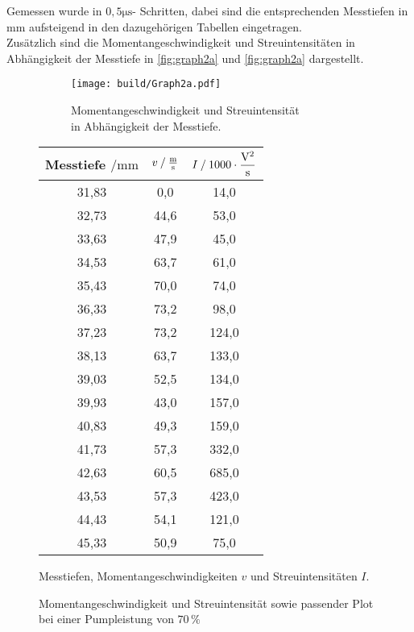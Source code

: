 Gemessen wurde in $0,5 \unit{\micro\second}$- Schritten, dabei sind die entsprechenden Messtiefen in $\unit{\milli\meter}$ aufsteigend in den dazugehörigen Tabellen eingetragen. \\

Zusätzlich sind die Momentangeschwindigkeit und Streuintensitäten in Abhängigkeit der Messtiefe in \autoref{fig:graph2a} und \autoref{fig:graph2a} dargestellt.

\begin{figure}[H]
    \begin{subfigure}{0.57\textwidth} 
        \centering
        \texttt{[image: build/Graph2a.pdf]} 
        \caption{Momentangeschwindigkeit und Streuintensität \\ in Abhängigkeit der Messtiefe.}
        \label{fig:graph2a}
        \qquad
    \end{subfigure}
    \begin{subtable}{0.43\textwidth}
        \centering
       \begin{tabular}{c c c}
        \toprule 
        {Messtiefe $\mathbin{/} \unit{\milli\meter}$} & {$v \mathbin{/} \unit{\frac{\meter}{\second}} $} & {$I \mathbin{/} 1000 \cdot \unit{\dfrac{\volt^2}{\second}}$}  \\
        \midrule 
           31,83     &      0,0     &     14,0    \\
           32,73     &     44,6     &     53,0    \\
           33,63     &     47,9     &     45,0    \\
           34,53     &     63,7     &     61,0    \\
           35,43     &     70,0     &     74,0    \\
           36,33     &     73,2     &     98,0    \\
           37,23     &     73,2     &    124,0    \\
           38,13     &     63,7     &    133,0    \\
           39,03     &     52,5     &    134,0    \\
           39,93     &     43,0     &    157,0    \\
           40,83     &     49,3     &    159,0    \\
           41,73     &     57,3     &    332,0    \\
           42,63     &     60,5     &    685,0    \\
           43,53     &     57,3     &    423,0    \\
           44,43     &     54,1     &    121,0    \\
           45,33     &     50,9     &     75,0    \\
        \bottomrule
       \end{tabular}
       \caption{Messtiefen, Momentangeschwindigkeiten $v$ und Streuintensitäten $I$.}
        \label{tab:2a}  
    \end{subtable}
    \caption{Momentangeschwindigkeit und Streuintensität sowie passender Plot bei einer Pumpleistung von $70 \,\%$} 
\end{figure}    


